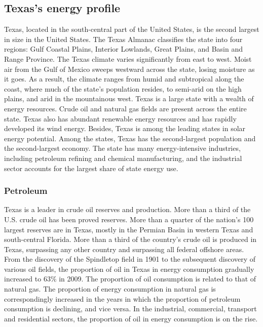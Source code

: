 \documentclass{mcmthesis}
\begin{document}
\subsection{Texas's energy profile}
Texas, located in the south-central part of the United States, is the second largest in size in the United States. The Texas Almanac classifies the state into four regions: Gulf Coastal Plains, Interior Lowlands, Great Plains, and Basin and Range Province. The Texas climate varies significantly from east to west. Moist air from the Gulf of Mexico sweeps westward across the state, losing moisture as it goes. As a result, the climate ranges from humid and subtropical along the coast, where much of the state's population resides, to semi-arid on the high plains, and arid in the mountainous west. Texas is a large state with a wealth of energy resources. Crude oil and natural gas fields are present across the entire state. Texas also has abundant renewable energy resources and has rapidly developed its wind energy. Besides, Texas is among the leading states in solar energy potential. Among the states, Texas has the second-largest population and the second-largest economy. The state has many energy-intensive industries, including petroleum refining and chemical manufacturing, and the industrial sector accounts for the largest share of state energy use.
\subsubsection{Petroleum}
  Texas is a leader in crude oil reserves and production. More than a third of the U.S. crude oil has been proved reserves.
  More than a quarter of the nation's 100 largest reserves are in Texas, mostly in the Permian Basin in western Texas and south-central Florida.
  More than a third of the country's crude oil is produced in Texas, surpassing any other country and surpassing all federal offshore areas.
  From the discovery of the Spindletop field in 1901 to the subsequent discovery of various oil fields, the proportion of oil in Texas
  in energy consumption gradually increased to $63\%$ in 2009. The proportion of oil consumption is related to that of natural gas.
  The proportion of energy consumption in natural gas is correspondingly increased in the years in which the proportion of petroleum consumption
  is declining, and vice versa. In the industrial, commercial, transport and residential sectors, the proportion of oil in energy consumption is on the rise.
\end{document}
